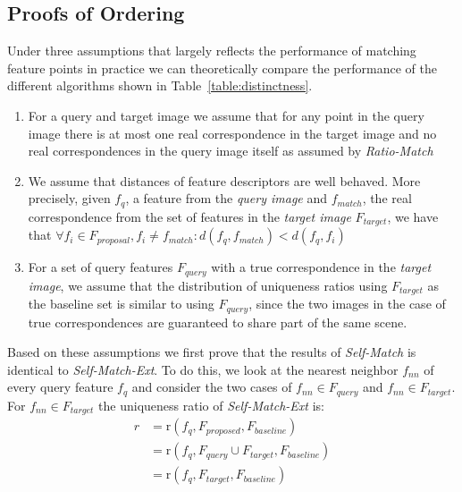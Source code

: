 \documentclass[journal]{IEEEtran}
\begin{document}
\subsection{Proofs of Ordering}

Under three assumptions that largely reflects the performance of 
matching feature points in practice we can theoretically compare the 
performance of the different algorithms shown in 
Table~\ref{table:distinctness}.

\begin{enumerate}
    \item{For a query and target image we assume that for any point in 
        the query image there is at most one real correspondence in the 
    target image and no real correspondences in the query image itself 
as assumed by \emph{Ratio-Match}}
    \item{We assume that distances of feature descriptors are well 
            behaved.  More precisely, given $f_q$, a feature from the 
            \emph{query image} and $f_{match}$, the real correspondence 
            from the set of features in the \emph{target image} 
            $F_{target}$, we have that $\forall f_i \in F_{proposal}, 
            f_i \neq f_{match}: d(f_q,f_{match}) < d(f_q, f_i)$}
     \item{For a set of query features $F_{query}$ with a true 
             correspondence in the \emph{target image}, we assume that 
             the distribution of uniqueness ratios using $F_{target}$ as 
             the baseline set is similar to using $F_{query}$, since the 
         two images in the case of true correspondences are guaranteed 
     to share part of the same scene.}
    \end{enumerate}

Based on these assumptions we first prove that the results of 
\emph{Self-Match} is identical to \emph{Self-Match-Ext}. To do this, we 
look at the nearest neighbor $f_{nn}$ of every query feature $f_{q}$ and 
consider the two cases of $f_{nn} \in F_{query}$ and $f_{nn} \in
F_{target}$. For $f_{nn} \in F_{target}$ the uniqueness ratio of 
\emph{Self-Match-Ext} is:
\begin{align*}
    r &= \text{r}(f_{q}, F_{proposed}, F_{baseline}) \\
        &= \text{r}(f_{q}, F_{query} \cup F_{target}, F_{baseline})\\
        &= \text{r}(f_{q}, F_{target}, F_{baseline})
\end{align*}
\end{document}
